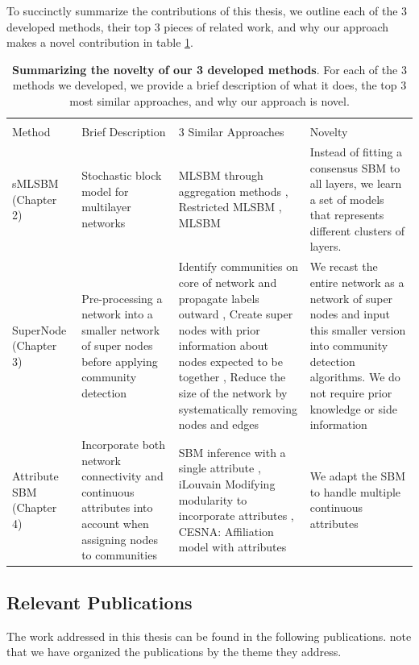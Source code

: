  To succinctly summarize the contributions of this thesis, we outline each of the 3 developed methods, their top 3 pieces of related work, and why our approach makes a novel contribution in table \ref{Tab11}. 
\begin{table}[h!]
\tiny
\begin{tabular}{ p{3cm}||p{3cm}|p{3cm}|p{3cm} }
 \multicolumn{4}{c}{} \\
 Method& Brief Description & 3 Similar Approaches & Novelty\\
 \hline
sMLSBM (Chapter 2)   & Stochastic block model for multilayer networks  & MLSBM through aggregation methods \cite{catala}, Restricted MLSBM \cite{mlsbm1},  MLSBM \cite{airoldi} & Instead of fitting a consensus SBM to all layers, we learn a set of models that represents different clusters of layers.\\
\hline
SuperNode (Chapter 3) &  Pre-processing a network into a smaller network of super nodes before applying community detection  & Identify communities on core of network and propagate labels outward \cite{peng}, Create super nodes with prior information about nodes expected to be together \cite{SuperNodeSide}, Reduce the size of the network by systematically removing nodes and edges \cite{gilbert}  & We recast the entire network as a network of super nodes and input this smaller version into community detection algorithms. We do not require prior knowledge or side information\\
\hline
Attribute SBM (Chapter 4) & Incorporate both network connectivity and continuous attributes into account when assigning nodes to communities  & SBM inference with a single attribute \cite{clauset}, iLouvain Modifying modularity to incorporate attributes \cite{ilouvain}, CESNA: Affiliation model with attributes \cite{cesna} & We adapt the SBM to handle multiple continuous attributes\\
 \hline
\end{tabular}
\caption{{\bf Summarizing the novelty of our 3 developed methods}. For each of the 3 methods we developed, we provide a brief description of what it does, the top 3 most similar approaches, and why our approach is novel.}
\label{Tab11}
\end{table}
\subsection{Relevant Publications}
The work addressed in this thesis can be found in the following publications. note that we have organized the publications by the theme they address. \\

